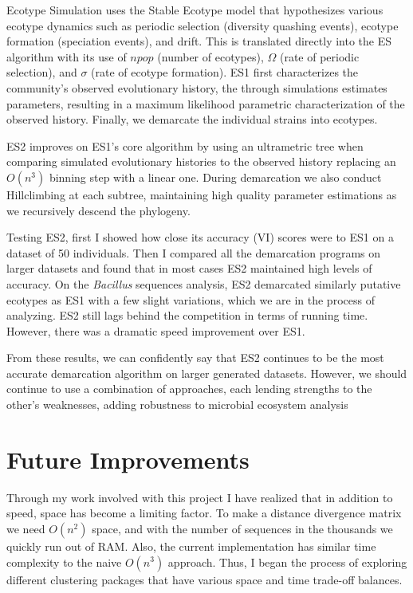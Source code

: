 Ecotype Simulation uses the Stable Ecotype model that hypothesizes various ecotype dynamics such as periodic selection (diversity quashing events), ecotype formation (speciation events), and drift.
This is translated directly into the ES algorithm with its use of $npop$ (number of ecotypes), $\Omega$ (rate of periodic selection), and $\sigma$ (rate of ecotype formation).
ES1 first characterizes the community's observed evolutionary history, the through simulations estimates parameters, resulting in a maximum likelihood parametric characterization of the observed history.
Finally, we demarcate the individual strains into ecotypes.

ES2 improves on ES1's core algorithm by using an ultrametric tree when comparing simulated evolutionary histories to the observed history replacing an $O(n^3)$ binning step with a linear one.
During demarcation we also conduct Hillclimbing at each subtree, maintaining high quality parameter estimations as we recursively descend the phylogeny.

Testing ES2, first I showed how close its accuracy (VI) scores were to ES1 on a dataset of 50 individuals.
Then I compared all the demarcation programs on larger datasets and found that in most cases ES2 maintained high levels of accuracy.
On the \emph{Bacillus} sequences analysis, ES2 demarcated similarly putative ecotypes as ES1 with a few slight variations, which we are in the process of analyzing.
ES2 still lags behind the competition in terms of running time.
However, there was a dramatic speed improvement over ES1.

From these results, we can confidently say that ES2 continues to be the most accurate demarcation algorithm on larger generated datasets. However, we should continue to use a combination of approaches, each lending strengths to the other's weaknesses, adding robustness to microbial ecosystem analysis~\cite{bohannan2003new}



\section{Future Improvements}
Through my work involved with this project I have realized that in addition to speed, space has become a limiting factor.
To make a distance divergence matrix we need $O(n^2)$ space, and with the number of sequences in the thousands we quickly run out of RAM.
Also, the current implementation has similar time complexity to the naive $O(n^3)$ approach.
Thus, I began the process of exploring different clustering packages that have various space and time trade-off balances.

